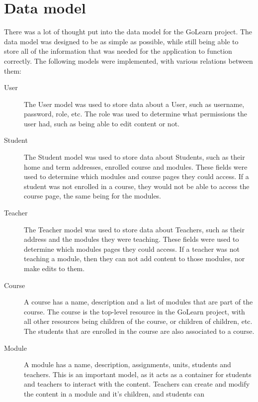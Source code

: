 \documentclass[12pt, a4paper,twoside]{report}
\theoremstyle{plain} %
\theoremstyle{definition} %
\numberwithin{equation}{chapter}
\begin{document}
\section{Data model}\label{sec:datamodel}

There was a lot of thought put into the data model for the GoLearn project.
The data model was designed to be as simple as possible, while still being
able to store all of the information that was needed for the application to
function correctly. The following models were implemented, with various
relations between them:

\begin{description}

    \item[User] {
        The User model was used to store data about a User, such as username,
        password, role, etc. The role was used to determine what permissions
        the user had, such as being able to edit content or not.
        }
    \item[Student] {
        The Student model was used to store data about Students, such as their
        home and term addresses, enrolled course and modules. These fields were
        used to determine which modules and course pages they could access. If
        a student was not enrolled in a course, they would not be able to access
        the course page, the same being for the modules.
        }
    \item[Teacher] {
        The Teacher model was used to store data about Teachers, such as their
        address and the modules they were teaching. These fields were used to
        determine which modules pages they could access. If a teacher was not
        teaching a module, then they can not add content to those modules, nor
        make edits to them.
        }
    \item[Course] {
        A course has a name, description and a list of modules that are part of
        the course. The course is the top-level resource in the GoLearn project,
        with all other resources being children of the course, or children of
        children, etc. The students that are enrolled in the course are also
        associated to a course.
        }
    \item[Module] {
        A module has a name, description, assignments, units, students and
        teachers. This is an important model, as it acts as a container for
        students and teachers to interact with the content. Teachers can create
        and modify the content in a module and it's children, and students can
}
\end{description}
\end{document}
